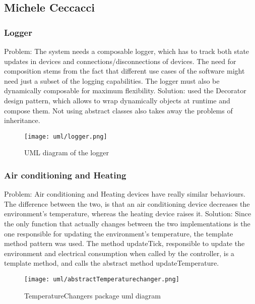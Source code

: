 \subsection{Michele Ceccacci}

\subsubsection{Logger} 
Problem: The system needs a composable logger, which has to track both state updates in devices and connections/disconnections
of devices. The need for composition stems from the fact that different use cases of the software might need just a subset
of the logging capabilities. The logger must also be dynamically composable for maximum flexibility.
Solution: used the Decorator design pattern, which allows to wrap dynamically objects at runtime and compose them.
Not using abstract classes also takes away the problems of inheritance. 
\begin{figure}[H]
\centering{}
\texttt{[image: uml/logger.png]}
\caption{UML diagram of the logger}
\label{ceccacci:uml:logger}
\end{figure}

\subsubsection{Air conditioning and Heating}
Problem: 
Air conditioning and Heating devices have really similar behaviours. The difference between the two, is that an air conditioning
device decreases the environment's temperature, whereas the heating device raises it.
Solution: Since the only function that actually changes between the two implementations is the one responsible for updating the
environment's temperature, the template method pattern was used. 
The method updateTick, responsible to update the environment and electrical consumption when called by the controller,
is a template method, and calls the abstract method updateTemperature.

\begin{figure}[H]
\centering{}
\texttt{[image: uml/abstractTemperaturechanger.png]}
\caption{TemperatureChangers package uml diagram}
\label{ceccacci:uml:temperaturechangers}
\end{figure}

